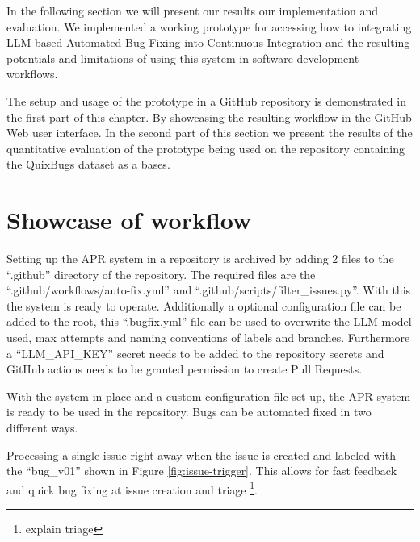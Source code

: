 In the following section we will present our results our implementation and evaluation. We implemented a working prototype for accessing how to integrating LLM based Automated Bug Fixing into Continuous Integration and the resulting potentials and limitations of using this system in software development workflows.

The setup and usage of the prototype in a GitHub repository is demonstrated in the first part of this chapter. By showcasing the resulting workflow in the GitHub Web user interface. In the second part of this section we  present the results of the quantitative evaluation of the prototype being used on the repository containing the QuixBugs dataset as a bases.

\section{Showcase of workflow} \label{section:showcase}

Setting up the APR system in a repository is archived by adding 2 files to the ``.github'' directory of the repository. The required files are the ``.github/workflows/auto-fix.yml'' and ``.github/scripts/filter\_issues.py''. With this the system is ready to operate. Additionally a optional configuration file can be added to the root, this ``.bugfix.yml'' file can be used to overwrite the LLM model used, max attempts and naming conventions of labels and branches. Furthermore a ``LLM\_API\_KEY'' secret needs to be added to the repository secrets and GitHub actions needs to be granted permission to create Pull Requests.


With the system in place and a custom configuration file set up, the APR system is ready to be used in the repository. Bugs can be automated fixed in two different ways.

Processing a single issue right away when the issue is created and labeled with the ``bug\_v01'' shown in Figure \ref{fig:issue-trigger}. This allows for fast feedback and quick bug fixing at issue creation and triage \footnote{explain triage}.


